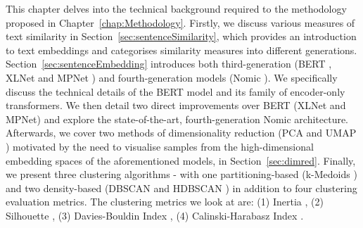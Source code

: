 \documentclass[10pt,oneside]{report}
\begin{document}
This chapter delves into the technical background required to the methodology proposed in Chapter~\ref{chap:Methodology}. Firstly, we discuss various measures of text similarity in Section~\ref{sec:sentenceSimilarity}, which provides an introduction to text embeddings and categorises similarity measures into different generations. Section~\ref{sec:sentenceEmbedding} introduces both third-generation (BERT \cite{devlin2019bert}, XLNet \cite{yang2019xlnet} and MPNet \cite{song2020mpnet}) and fourth-generation models (Nomic \cite{nussbaum2024nomic}). We specifically discuss the technical details of the BERT model and its family of encoder-only transformers. We then detail two direct improvements over BERT (XLNet and MPNet) and explore the state-of-the-art, fourth-generation Nomic architecture. Afterwards, we cover two methods of dimensionality reduction (PCA \cite{pearson1901liii,hotelling1933analysis} and UMAP \cite{mcinnes2018umap}) motivated by the need to visualise samples from the high-dimensional embedding spaces of the aforementioned models, in Section~\ref{sec:dimred}. Finally, we present three clustering algorithms - with one partitioning-based (k-Medoids  \cite{}) and two density-based (DBSCAN \cite{ester1996density} and HDBSCAN \cite{campello2013density}) in addition to four clustering evaluation metrics. The clustering metrics we look at are: (1) Inertia \cite{}, (2) Silhouette \cite{rousseeuw1987silhouettes}, (3) Davies-Bouldin Index \cite{davies1979cluster}, (4) Calinski-Harabasz Index \cite{calinski1974dendrite}.  \\ 

\end{document}
